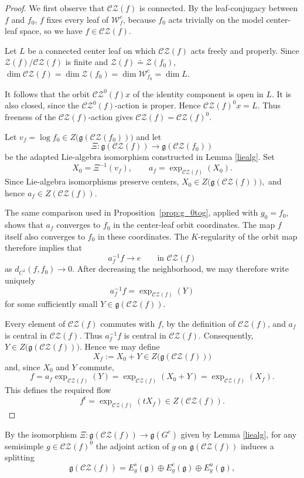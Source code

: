 \documentclass[11pt]{amsart}
\numberwithin{equation}{section}
\newcommand{\CZ}{\mathcal{CZ}}
\theoremstyle{plain}
\begin{document}
\begin{proof}
We first observe that $\mathcal{CZ}(f)$ is connected. By the leaf-conjugacy between $f$ and $f_0$,
$f$ fixes every leaf of $\mathcal W_f^c$, because $f_0$ acts trivially
on the model center-leaf space, so we have $f\in \CZ(f)$.

Let $L$ be a connected center leaf on which $\CZ(f)$ acts freely and
properly. Since $\mathcal Z(f)/\CZ(f)$ is finite and
$\mathcal Z(f)\doteq\mathcal Z(f_0)$,
$
\dim \CZ(f)
 =\dim\mathcal Z(f_0)
 =\dim\mathcal W_{f_0}^c
 =\dim L.$
 
It follows that the orbit $\CZ^0(f)x$ of the identity component is open in
$L$. It is also closed, since the $\CZ^0(f)$-action is proper. Hence
$\CZ(f)^0x=L$. Thus freeness of the $\CZ(f)$-action gives $
\CZ(f)=\CZ(f)^0.$

Let
$
v_f=\log f_0\in Z\bigl(\mathfrak g(\mathcal{CZ}(f_0))\bigr)$ 
and let
\[
\Xi:\mathfrak g(\CZ(f))\longrightarrow
\mathfrak g(\mathcal{CZ}(f_0))
\]
be the adapted Lie-algebra isomorphism constructed in Lemma \ref{liealg}. Set
\[
X_0=\Xi^{-1}(v_f),
\qquad
a_f=\exp_{\CZ(f)}(X_0).
\]
Since Lie-algebra isomorphisms preserve centers,
$
X_0\in Z\big(\mathfrak g(\CZ(f))\big),$
and hence $a_f\in Z(\CZ(f))$.

The same comparison used in Proposition~\ref{prop:g_0tog}, applied
with $g_0=f_0$, shows that $a_f$ converges to $f_0$ in the center-leaf
orbit coordinates. The map $f$ itself also converges to $f_0$ in
these coordinates. The $K$-regularity of the orbit map therefore
implies that
\[
a_f^{-1}f\longrightarrow e
\qquad\text{in }\CZ(f)
\]
as $d_{C^1}(f,f_0)\to0$. After decreasing the neighborhood, we may
therefore write uniquely
\[
a_f^{-1}f=\exp_{\CZ(f)}(Y)
\]
for some sufficiently small $Y\in\mathfrak g(\CZ(f))$.

Every element of $\CZ(f)$ commutes with $f$, by the definition of
$\mathcal{CZ}(f)$, and $a_f$ is central in $\CZ(f)$. Thus
$a_f^{-1}f$ is central in $\CZ(f)$. Consequently, $Y\in Z\big(\mathfrak g(\CZ(f))\big)$. Hence we may define
\[
X_f:=X_0+Y\in  Z\big(\mathfrak g(\CZ(f))\big)
\]
and, since $X_0$ and $Y$ commute,
\[
f=a_f\exp_{\CZ(f)}(Y)
  =\exp_{\CZ(f)}(X_0+Y)
  =\exp_{\CZ(f)}(X_f).
\]
This defines the required flow
\[
f^t=\exp_{\CZ(f)}(tX_f)\in Z(\CZ(f)).
\]
\end{proof}

By the isomorphism $\Xi: \mathfrak {g}(\CZ(f))\to \mathfrak {g}(G^c)$ given by Lemma \ref{liealg}, for any  semisimple $g\in\CZ(f)^0$ the adjoint action of $g$ on
$\mathfrak g(\CZ(f))$ induces a splitting
\begin{equation}\label{eq:liealgsplit}
    \mathfrak g(\CZ(f))=E^s_g(\mathfrak g)\oplus E^c_g(\mathfrak g)\oplus E^u_g(\mathfrak g),
\end{equation}
\end{document}

